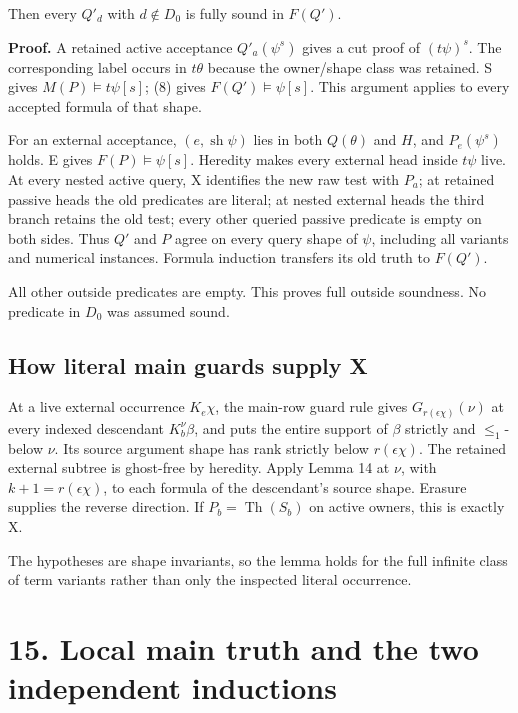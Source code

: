 \documentclass[
  11pt,
  letterpaper,
]{article}
\begin{document}
Then every \(Q'_d\) with \(d\notin D_0\) is fully sound in \(F(Q')\).

\textbf{Proof.} A retained active acceptance \(Q'_a(\psi^s)\) gives a
cut proof of \((t\psi)^s\). The corresponding label occurs in
\(t\theta\) because the owner/shape class was retained. S gives
\(M(P)\models t\psi[s]\); (8) gives \(F(Q')\models\psi[s]\). This
argument applies to every accepted formula of that shape.

For an external acceptance, \((e,\operatorname{sh}\psi)\) lies in both
\(Q(\theta)\) and \(H\), and \(P_e(\psi^s)\) holds. E gives
\(F(P)\models\psi[s]\). Heredity makes every external head inside
\(t\psi\) live. At every nested active query, X identifies the new raw
test with \(P_a\); at retained passive heads the old predicates are
literal; at nested external heads the third branch retains the old test;
every other queried passive predicate is empty on both sides. Thus
\(Q'\) and \(P\) agree on every query shape of \(\psi\), including all
variants and numerical instances. Formula induction transfers its old
truth to \(F(Q')\).

All other outside predicates are empty. This proves full outside
soundness. No predicate in \(D_0\) was assumed sound.

\subsection{How literal main guards supply
X}\label{how-literal-main-guards-supply-x}

At a live external occurrence \(K_e\chi\), the main-row guard rule gives
\(G_{r(\epsilon\chi)}(\nu)\) at every indexed descendant
\(K_b^\nu\beta\), and puts the entire support of \(\beta\) strictly and
\(\leq_1\)-below \(\nu\). Its source argument shape has rank strictly
below \(r(\epsilon\chi)\). The retained external subtree is ghost-free
by heredity. Apply Lemma 14 at \(\nu\), with \(k+1=r(\epsilon\chi)\), to
each formula of the descendant's source shape. Erasure supplies the
reverse direction. If \(P_b=\operatorname{Th}(S_b)\) on active owners,
this is exactly X.

The hypotheses are shape invariants, so the lemma holds for the full
infinite class of term variants rather than only the inspected literal
occurrence.

\section{15. Local main truth and the two independent
inductions}\label{local-main-truth-and-the-two-independent-inductions}
\end{document}
